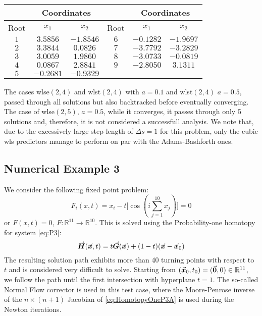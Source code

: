 \begin{table}[b]
	\centering
	\begin{minipage}{0.75\textwidth}
		\label{table:TABLE_CH5EX2_B}
		\small
		\renewcommand{\arraystretch}{1.25}
		\begin{tabular}{c c c c c c}
			\hline\hline
			& \multicolumn{2}{c}{Coordinates} & & 
			\multicolumn{2}{c}{Coordinates} \\
			\hline
			Root  & $x_1$ & $x_2$ &  Root  & $x_1$  & $x_2$ \\
			\hline
			$1$ & $3.5856$ & $-1.8546$ & $6$ & $-0.1282$ & $-1.9697$ \\
			$2$ & $3.3844$ & $0.0826$  & $7$ & $-3.7792$ & $-3.2829$ \\
			$3$ & $3.0059$ & $1.9860$  & $8$ & $-3.0733$ & $-0.0819$ \\
			$4$ & $0.0867$ & $2.8841$  & $9$ & $-2.8050$ & $3.1311$ \\
			$5$ & $-0.2681$ & $-0.9329$ &  &  &  \\
			\hline\hline
		\end{tabular}
	\end{minipage}
\end{table}
The cases \acrshort{wlse}$(2,4)$ and \acrshort{wlst}$(2,4)$ with $a=0.1$ and 
\acrshort{wlst}$(2,4)$ $a=0.5$,
passed through all solutions but also backtracked  before eventually converging.
The case of \acrshort{wlse}$(2,5)$, $a=0.5$, while it converges, it passes 
through only 5 
solutions and, therefore, it is not considered a successfull
analysis. We note that, due to the excessively large step-length of $\Delta
s=1$ for this problem, only the cubic \acrshort{wls} predictors manage to 
perform on par with the Adams-Bashforth ones. 

\subsection{Numerical Example 3}
We consider the following fixed point 
problem\cite{Watson79,Georg81,Schwetlick87}:
\begin{equation}
	F_i(x,t) = x_i-t\bigl[\cos(i\sum_{j=1}^{10} x_j)\bigr]=0
	\label{eq:P3}
\end{equation}
or $F(x,t)=0$, $F:\mathbb{R}^{11}\rightarrow\mathbb{R}^{10}$. This is 
solved using the Probability-one
homotopy\cite{Chow78,Watson:1990} for system \ref{eq:P3}:
\begin{equation}
	\vec{\bm{H}}(\vec{\bm{x}},t)=t \vec{\bm{G}}(\vec{\bm{x}})+(1-t)(\vec{\bm{x}}-\vec{\bm{x}}_0)
	\label{eq:HomotopyOneP3A}
\end{equation}
The resulting solution path exhibits more than 40 turning points with respect to
$t$ and is considered very difficult to solve. Starting from
$(\vec{\bm{x}}_0,t_0)=(\vec{\bm{0}},0)\in\mathbb{R}^{11}$, we follow the path until the
first intersection with hyperplane $t=1$. The so-called Normal Flow
corrector\cite{Watson86} is used in this test case, where the Moore-Penrose 
inverse of the
$n\times(n+1)$ Jacobian of \ref{eq:HomotopyOneP3A} is used during the Newton 
iterations.

